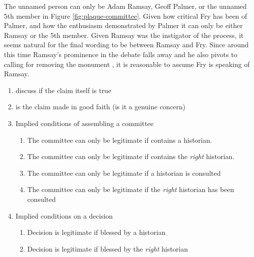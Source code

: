 The unnamed person can only be Adam Ramsay, Geoff Palmer, or the unnamed 5th member in Figure \ref{fig:plaque-committee}. Given how critical Fry has been of Palmer, and how the enthusiasm demonstrated by Palmer it can only be either Ramsay or the 5th member. Given Ramsay was the instigator of the process, it seems natural for the final wording to be between Ramsay and Fry. Since around this time Ramsay's prominence in the debate falls away and he also pivots to calling for removing the monument \cite{ramsay_2020}, it is reasonable to assume Fry is speaking of Ramsay.


\begin{enumerate}
    \item discuss if the claim itself is true
    \item is the claim made in good faith (is it a genuine concern)
    \item Implied conditions of assembling a committee
    \begin{enumerate}
        \item The committee can only be legitimate if contains a historian.
        \item The committee can only be legitimate if contains the \textit{right} historian.
        \item The committee can only be legitimate if a historian is consulted
        \item The committee can only be legitimate if the \textit{right} historian has been consulted
    \end{enumerate}
    \item Implied conditions on a decision
    \begin{enumerate}
        \item Decision is legitimate if blessed by a historian
        \item Decision is legitimate if blessed by the \textit{right} historian
    \end{enumerate}
\end{enumerate}

